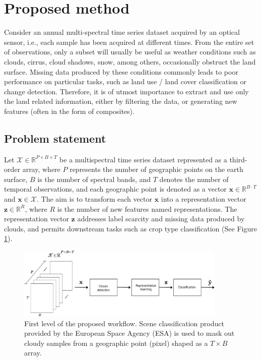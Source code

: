 \documentclass[journal,article,submit,pdftex,moreauthors]{Definitions/mdpi}
\begin{document}
\section{Proposed method}
Consider an annual multi-spectral time series dataset acquired by an optical sensor, i.e., each sample has been acquired at different times. From the entire set of observations, only a subset will usually be useful as weather conditions such as clouds, cirrus, cloud shadows, snow, among others, occasionally obstruct the land surface. 
Missing data produced by these conditions commonly leads to poor performance on particular tasks, such as land use / land cover classification or change detection.
Therefore, it is of utmost importance to extract and  use only the land related information, either by filtering the data, or generating new features (often in the form of composites).

\subsection{Problem statement}
Let $\mathscr{X} \in \mathbb{R}^{P \times B \times T}$ be a multispectral time series dataset represented as a third-order array, where $P$ represents the number of geographic points on the earth surface, $B$ is the number of spectral bands, and $T$ denotes the number of temporal observations, and each geographic point is denoted as a vector $\mathbf{x} \in \mathbb{R}^{B \cdot T}$ and $\mathbf{x} \in \mathscr{X}$. The aim is to transform each vector $\mathbf{x}$ into a representation vector $\mathbf{z} \in \mathbb{R}^{R}$, where $R$ is the number of new features named representations. The representation vector $\mathbf{z}$ addresses label scarcity and missing data produced by clouds, and permits downstream tasks such as crop type classification (See Figure \ref{bigpicture}).

\begin{figure}[H]
	\centering
	\includegraphics[width=10cm]{figures/bigpicture_with_clement.pdf}
	\caption{First level of the proposed workflow. Scene classification product provided by the European Space Agency (ESA) is used to mask out cloudy samples from a geographic point (pixel) shaped as a $T \times B$ array. 
}
	\label{bigpicture}
	\centering
\end{figure}
\end{document}
